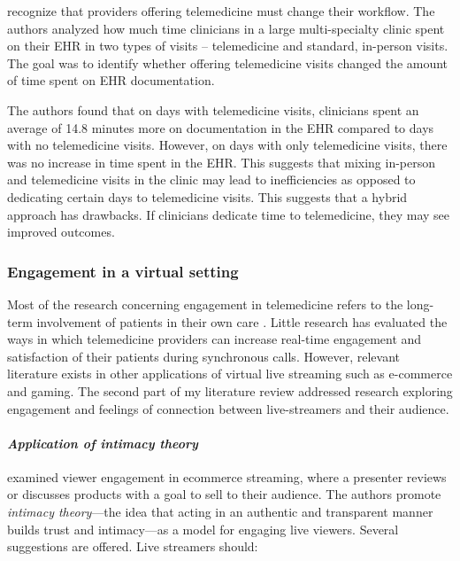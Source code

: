 \documentclass[utf8]{FrontiersinHarvard} %
\begin{document}
\citet{apathyTelemedicineInPersonVisit2024} recognize that providers offering telemedicine must change their workflow. The authors analyzed how much time clinicians in a large multi-specialty clinic spent on their EHR in two types of visits -- telemedicine and standard, in-person visits. The goal was to identify whether offering telemedicine visits changed the amount of time spent on EHR documentation.

The authors found that on days with telemedicine visits, clinicians spent an average of 14.8 minutes more on documentation in the EHR compared to days with no telemedicine visits. However, on days with only telemedicine visits, there was no increase in time spent in the EHR. This suggests that mixing in-person and telemedicine visits in the clinic may lead to inefficiencies as opposed to dedicating certain days to telemedicine visits. This suggests that a hybrid approach has drawbacks. If clinicians dedicate time to telemedicine, they may see improved outcomes.

\subsubsection{Engagement in a virtual setting}

Most of the research concerning engagement in telemedicine refers to the long-term involvement of patients in their own care \citep{Lyles2020Using, monachelliDesigningMHealthApps2024}. Little research has evaluated the ways in which telemedicine providers can increase real-time engagement and satisfaction of their patients during synchronous calls. However, relevant literature exists in other applications of virtual live streaming such as e-commerce and gaming. The second part of my literature review addressed research exploring engagement and feelings of connection between live-streamers and their audience.

\paragraph{\textit{Application of intimacy theory}}

\citet{liuHowCanLive2021} examined viewer engagement in ecommerce streaming, where a presenter reviews or discusses products with a goal to sell to their audience. The authors promote \textit{intimacy theory}---the idea that acting in an authentic and transparent manner builds trust and intimacy---as a model for engaging live viewers. Several suggestions are offered. Live streamers should:
\end{document}

